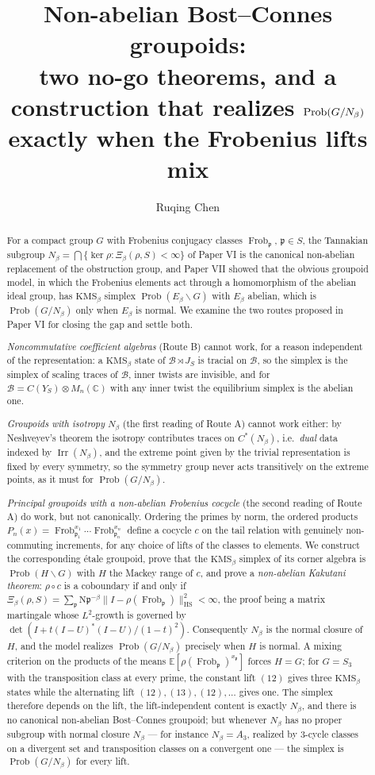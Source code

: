 \documentclass[11pt]{amsart}
\title[Non-abelian Bost--Connes groupoids]{Non-abelian Bost--Connes groupoids:\\ two no-go theorems, and a construction that realizes $\Prob(G/N_\beta)$\\ exactly when the Frobenius lifts mix}
\author{Ruqing Chen}
\date{}
\numberwithin{equation}{section}
\theoremstyle{definition}
\theoremstyle{remark}
\newcommand{\C}{\mathbb{C}}
\newcommand{\cB}{\mathcal{B}}
\newcommand{\pp}{\mathfrak{p}}
\newcommand{\Ns}{\mathrm{N}}
\newcommand{\Frob}{\operatorname{Frob}}
\newcommand{\Irr}{\operatorname{Irr}}
\newcommand{\HS}{\mathrm{HS}}
\newcommand{\Prob}{\operatorname{Prob}}
\newcommand{\E}{\mathbb{E}}
\begin{document}
\begin{abstract}
For a compact group $G$ with Frobenius conjugacy classes $\Frob_\pp$, $\pp\in S$, the Tannakian
subgroup $N_\beta=\bigcap\{\ker\rho:\Xi_\beta(\rho,S)<\infty\}$ of Paper VI is the canonical
non-abelian replacement of the obstruction group, and Paper VII showed that the obvious
groupoid model, in which the Frobenius elements act through a homomorphism of the abelian
ideal group, has $\mathrm{KMS}_\beta$ simplex $\Prob(E_\beta\backslash G)$ with $E_\beta$
abelian, which is $\Prob(G/N_\beta)$ only when $E_\beta$ is normal. We examine the two routes
proposed in Paper VI for closing the gap and settle both.

\emph{Noncommutative coefficient algebras} (Route B) cannot work, for a reason independent of
the representation: a $\mathrm{KMS}_\beta$ state of $\cB\rtimes J_S$ is tracial on $\cB$, so the
simplex is the simplex of scaling traces of $\cB$, inner twists are invisible, and for
$\cB=C(Y_S)\otimes M_n(\C)$ with any inner twist the equilibrium simplex is the abelian one.

\emph{Groupoids with isotropy} $N_\beta$ (the first reading of Route A) cannot work either:
by Neshveyev's theorem the isotropy contributes traces on $C^*(N_\beta)$, i.e.\ \emph{dual}
data indexed by $\Irr(N_\beta)$, and the extreme point given by the trivial representation
is fixed by every symmetry, so the symmetry group never acts transitively on the extreme
points, as it must for $\Prob(G/N_\beta)$.

\emph{Principal groupoids with a non-abelian Frobenius cocycle} (the second reading of Route
A) do work, but not canonically. Ordering the primes by norm, the ordered products
$P_n(x)=\Frob_{\pp_1}^{x_1}\cdots\Frob_{\pp_n}^{x_n}$ define a cocycle $c$ on the tail
relation with genuinely non-commuting increments, for any choice of lifts of the classes to
elements. We construct the corresponding \'etale groupoid, prove that the
$\mathrm{KMS}_\beta$ simplex of its corner algebra is $\Prob(H\backslash G)$ with $H$ the Mackey
range of $c$, and prove a \emph{non-abelian Kakutani theorem}: $\rho\circ c$ is a coboundary
if and only if $\Xi_\beta(\rho,S)=\sum_\pp\Ns\pp^{-\beta}\|I-\rho(\Frob_\pp)\|_{\HS}^2<\infty$,
the proof being a matrix martingale whose $L^2$-growth is governed by
$\det(I+t(I-U)^*(I-U)/(1-t)^2)$. Consequently $N_\beta$ is the normal closure of $H$, and
the model realizes $\Prob(G/N_\beta)$ precisely when $H$ is normal. A mixing criterion on the
products of the means $\E[\rho(\Frob_\pp)^{x_\pp}]$ forces $H=G$; for $G=S_3$ with the
transposition class at every prime, the constant lift $(12)$ gives three
$\mathrm{KMS}_\beta$ states while the alternating lift $(12),(13),(12),\dots$ gives one. The
simplex therefore depends on the lift, the lift-independent content is exactly $N_\beta$,
and there is no canonical non-abelian Bost--Connes groupoid; but whenever $N_\beta$ has no
proper subgroup with normal closure $N_\beta$ --- for instance $N_\beta=A_3$, realized by
$3$-cycle classes on a divergent set and transposition classes on a convergent one --- the
simplex is $\Prob(G/N_\beta)$ for every lift.
\end{abstract}
\end{document}

